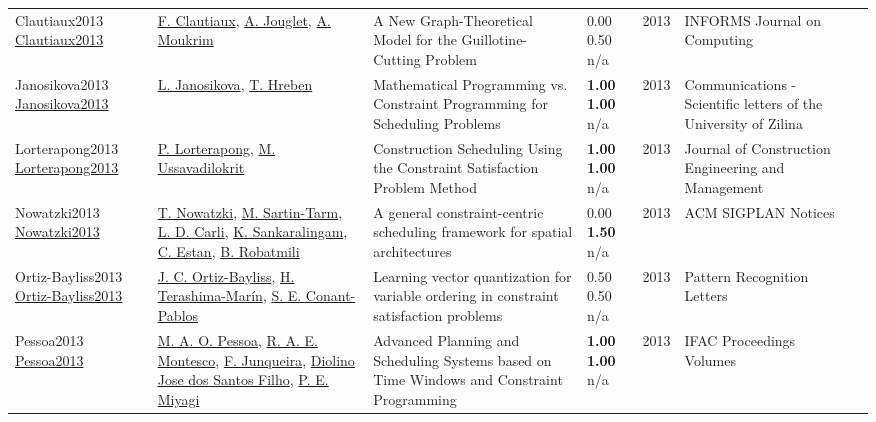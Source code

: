 {\begin{longtable}{p{3cm}p{5cm}p{10cm}p{1cm}rp{2.5cm}l}
Clautiaux2013 \href{http://dx.doi.org/10.1287/ijoc.1110.0478}{Clautiaux2013} & \hyperref[auth:a1686]{F. Clautiaux}, \hyperref[auth:a929]{A. Jouglet}, \hyperref[auth:a1170]{A. Moukrim} & A New Graph-Theoretical Model for the Guillotine-Cutting Problem & \noindent{}\textcolor{black!50}{0.00} 0.50 n/a & 2013 & \cellcolor{red!20}INFORMS Journal on Computing & \cite{Clautiaux2013}\\
Janosikova2013 \href{http://dx.doi.org/10.26552/com.c.2013.1.39-43}{Janosikova2013} & \hyperref[auth:a2038]{L. Janosikova}, \hyperref[auth:a2039]{T. Hreben} & Mathematical Programming vs. Constraint Programming for Scheduling Problems & \noindent{}\textbf{1.00} \textbf{1.00} n/a & 2013 & Communications - Scientific letters of the University of Zilina & \cite{Janosikova2013}\\
Lorterapong2013 \href{http://dx.doi.org/10.1061/(asce)co.1943-7862.0000582}{Lorterapong2013} & \hyperref[auth:a1792]{P. Lorterapong}, \hyperref[auth:a1793]{M. Ussavadilokrit} & Construction Scheduling Using the Constraint Satisfaction Problem Method & \noindent{}\textbf{1.00} \textbf{1.00} n/a & 2013 & Journal of Construction Engineering and Management & \cite{Lorterapong2013}\\
Nowatzki2013 \href{http://dx.doi.org/10.1145/2499370.2462163}{Nowatzki2013} & \hyperref[auth:a1631]{T. Nowatzki}, \hyperref[auth:a1632]{M. Sartin-Tarm}, \hyperref[auth:a1633]{L. D. Carli}, \hyperref[auth:a1634]{K. Sankaralingam}, \hyperref[auth:a1635]{C. Estan}, \hyperref[auth:a1636]{B. Robatmili} & A general constraint-centric scheduling framework for spatial architectures & \noindent{}\textcolor{black!50}{0.00} \textbf{1.50} n/a & 2013 & ACM SIGPLAN Notices & \cite{Nowatzki2013}\\
Ortiz-Bayliss2013 \href{http://dx.doi.org/10.1016/j.patrec.2012.09.009}{Ortiz-Bayliss2013} & \hyperref[auth:a1781]{J. C. Ortiz-Bayliss}, \hyperref[auth:a1608]{H. Terashima-Marín}, \hyperref[auth:a1782]{S. E. Conant-Pablos} & Learning vector quantization for variable ordering in constraint satisfaction problems & \noindent{}0.50 0.50 n/a & 2013 & Pattern Recognition Letters & \cite{Ortiz-Bayliss2013}\\
Pessoa2013 \href{http://dx.doi.org/10.3182/20130522-3-br-4036.00069}{Pessoa2013} & \hyperref[auth:a1669]{M. A. O. Pessoa}, \hyperref[auth:a1670]{R. A. E. Montesco}, \hyperref[auth:a1671]{F. Junqueira}, \hyperref[auth:a1672]{Diolino Jose dos Santos Filho}, \hyperref[auth:a1673]{P. E. Miyagi} & \cellcolor{gold!20}Advanced Planning and Scheduling Systems based on Time Windows and Constraint Programming & \noindent{}\textbf{1.00} \textbf{1.00} n/a & 2013 & IFAC Proceedings Volumes & \cite{Pessoa2013}\\

\end{longtable}}
